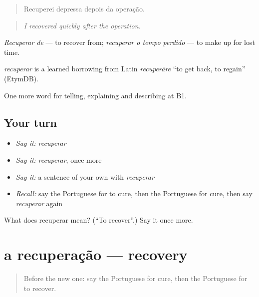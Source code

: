 \begin{quote}
Recuperei depressa depois da operação.
\end{quote}

\begin{quote}
\emph{I recovered quickly after the operation.}
\end{quote}

\emph{Recuperar de} — to recover from; \emph{recuperar o tempo perdido} — to make up for lost time.

\begin{cousinweb}
\emph{recuperar} is a learned borrowing from Latin \emph{recuperāre} \textquotedblleft{}to get back, to regain\textquotedblright{} (EtymDB).
\end{cousinweb}

\begin{grammarlens}[title={What you've built}]
One more word for telling, explaining and describing at B1.
\end{grammarlens}

\subsection*{Your turn}
\begin{itemize}
\raggedright
  \item \emph{Say it:} \emph{recuperar}
  \item \emph{Say it:} \emph{recuperar}, once more
  \item \emph{Say it:} a sentence of your own with \emph{recuperar}
  \item \emph{Recall:} say the Portuguese for to cure, then the Portuguese for cure, then say \emph{recuperar} again
\end{itemize}

\begin{tcolorbox}[breakable,colback=teal!4,colframe=teal!35!black,title={Before you move on}]
What does recuperar mean? (\textquotedblleft{}To recover\textquotedblright{}.) Say it once more.
\end{tcolorbox}
\section[a recuperação]{a recuperação — recovery}

\label{lesson:PT-C488-recuperacao}



\begin{quote}
Before the new one: say the Portuguese for cure, then the Portuguese for to recover.
\end{quote}

